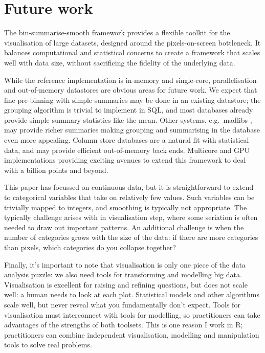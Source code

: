 \documentclass[journal]{vgtc}                %
\begin{document}
\section{Future work}
\label{sec:conclusion}

The bin-summarise-smooth framework provides a flexible toolkit for the visualisation of large datasets, designed around the pixels-on-screen bottleneck. It balances computational and statistical concerns to create a framework that scales well with data size, without sacrificing the fidelity of the underlying data.

While the reference implementation is in-memory and single-core, parallelisation and out-of-memory datastores are obvious areas for future work. We expect that fine pre-binning with simple summaries may be done in an existing datastore; the grouping algorithm is trivial to implement in SQL, and most databases already provide simple summary statistics like the mean. Other systems, e.g.\ madlibs \citep{hellerstein:2012}, may provide richer summaries making grouping and summarising in the database even more appealing. Column store databases \citep{kersten:2011} are a natural fit with statistical data, and may provide efficient out-of-memory back ends. Multicore and GPU implementations providing exciting avenues to extend this framework to deal with a billion points and beyond.

This paper has focussed on continuous data, but it is straightforward to extend to categorical variables that take on relatively few values. Such variables can be trivially mapped to integers, and smoothing is typically not appropriate. The typically challenge arises with in visualisation step, where some seriation \citep{hahsler:2008} is often needed to draw out important patterns. An additional challenge is when the number of categories grows with the size of the data: if there are more categories than pixels, which categories do you collapse together?

Finally, it's important to note that visualisation is only one piece of the data analysis puzzle: we also need tools for transforming and modelling big data. Visualisation is excellent for raising and refining questions, but does not scale well: a human needs to look at each plot. Statistical models and other algorithms scale well, but never reveal what you fundamentally don't expect. Tools for visualisation must interconnect with tools for modelling, so practitioners can take advantages of the strengths of both toolsets. This is one reason I work in R; practitioners can combine independent visualisation, modelling and manipulation tools to solve real problems.





\end{document}
